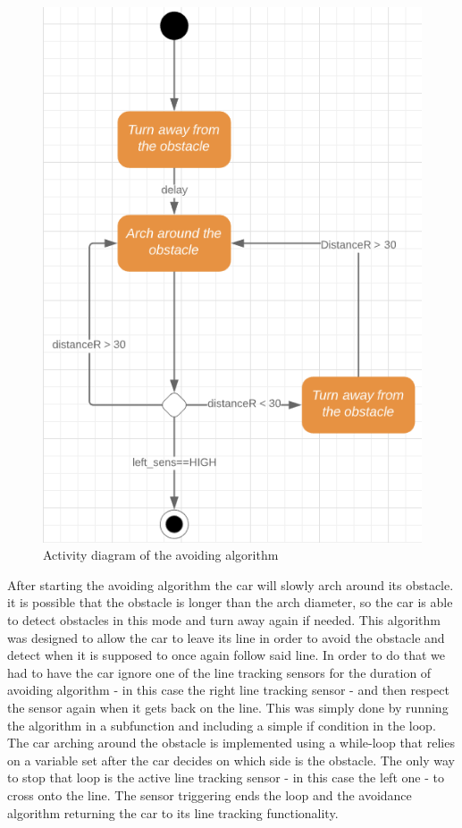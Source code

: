 \documentclass[conference]{IEEEtran}
\begin{document}
\begin{figure}[h!]
	\includegraphics[width=\linewidth]{AvoidActivityDiagram.png}
	\caption{Activity diagram of the avoiding algorithm}
	\label{fig:AAD}
\end{figure}
After starting the avoiding algorithm the car will slowly arch around its obstacle. it is possible that the obstacle is longer than the arch diameter, so the car is able to detect obstacles in this mode and turn away again if needed.
This algorithm was designed to allow the car to leave its line in order to avoid the obstacle and detect when it is supposed to once again follow said line. In order to do that we had to have the car ignore one of the line tracking sensors for the duration of avoiding algorithm - in this case the right line tracking sensor - and then respect the sensor again when it gets back on the line. This was simply done by running the algorithm in a subfunction and including a simple if condition in the loop. The car arching around the obstacle is implemented using a while-loop that relies on a variable set after the car decides on which side is the obstacle. The only way to stop that loop is the active line tracking sensor - in this case the left one - to cross onto the line. The sensor triggering ends the loop and the avoidance algorithm returning the car to its line tracking functionality.
\end{document}
